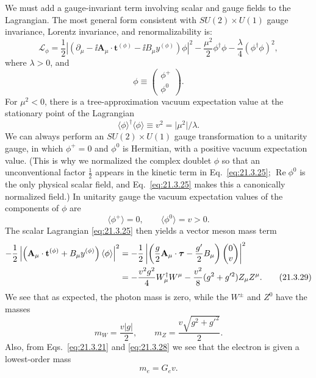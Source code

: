 We must add a gauge-invariant term involving scalar and gauge fields to the Lagrangian. The most general form consistent with $SU(2)\times U(1)$ gauge invariance, Lorentz invariance, and renormalizability is:
\begin{equation}
\mathcal{L}_\phi
=\frac{1}{2}\left|
\left(\partial_\mu-\ii\mathbf{A}_\mu\cdot\mathbf{t}^{(\phi)}
-\ii B_\mu y^{(\phi)}\right)\phi
\right|^2
-\frac{\mu^2}{2}\phi^\dagger\phi
-\frac{\lambda}{4}(\phi^\dagger\phi)^2,
\tag{21.3.25}\label{eq:21.3.25}
\end{equation}
where $\lambda>0$, and
\begin{equation}
\phi\equiv\begin{pmatrix}\phi^+\\\phi^0\end{pmatrix}.
\tag{21.3.26}\label{eq:21.3.26}
\end{equation}
For $\mu^2<0$, there is a tree-approximation vacuum expectation value at the stationary point of the Lagrangian
\begin{equation}
\langle\phi\rangle^\dagger\langle\phi\rangle
\equiv v^2=\lvert\mu^2\rvert/\lambda.
\tag{21.3.27}\label{eq:21.3.27}
\end{equation}
We can always perform an $SU(2)\times U(1)$ gauge transformation to a unitarity gauge, in which $\phi^+=0$ and $\phi^0$ is Hermitian, with a positive vacuum expectation value. (This is why we normalized the complex doublet $\phi$ so that an unconventional factor $\tfrac12$ appears in the kinetic term in Eq.~\eqref{eq:21.3.25}; $\operatorname{Re}\phi^0$ is the only physical scalar field, and Eq.~\eqref{eq:21.3.25} makes this a canonically normalized field.) In unitarity gauge the vacuum expectation values of the components of $\phi$ are
\begin{equation}
\langle\phi^+\rangle=0,
\qquad
\langle\phi^0\rangle=v>0.
\tag{21.3.28}\label{eq:21.3.28}
\end{equation}
The scalar Lagrangian \eqref{eq:21.3.25} then yields a vector meson mass term
\begin{align}
-\frac{1}{2}
\left|
\left(\mathbf{A}_\mu\cdot\mathbf{t}^{(\phi)}
+B_\mu y^{(\phi)}\right)\langle\phi\rangle
\right|^2
&=-\frac{1}{2}
\left|
\left(\frac{g}{2}\mathbf{A}_\mu\cdot\boldsymbol{\tau}-\frac{g'}{2}B_\mu\right)
\begin{pmatrix}0\\v\end{pmatrix}
\right|^2
\notag\\
&=-\frac{v^2g^2}{4}W_\mu^\dagger W^\mu
-\frac{v^2}{8}(g^2+g'^2)Z_\mu Z^\mu.
\tag{21.3.29}\label{eq:21.3.29}
\end{align}
We see that as expected, the photon mass is zero, while the $W^\pm$ and $Z^0$ have the masses
\begin{equation}
m_W=\frac{v\lvert g\rvert}{2},
\qquad
m_Z=\frac{v\sqrt{g^2+g'^2}}{2}.
\tag{21.3.30}\label{eq:21.3.30}
\end{equation}
Also, from Eqs.~\eqref{eq:21.3.21} and \eqref{eq:21.3.28} we see that the electron is given a lowest-order mass
\begin{equation}
m_e=G_ev.
\tag{21.3.31}\label{eq:21.3.31}
\end{equation}

